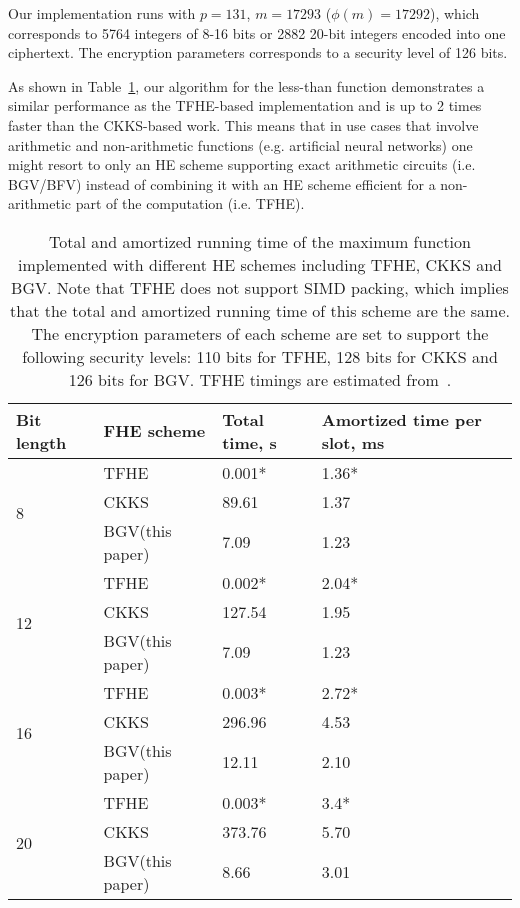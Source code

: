     Our implementation runs with $p=131$, $m=17293$ ($\phi(m)=17292$), which corresponds to 5764 integers of 8-16 bits or 2882 20-bit integers encoded into one ciphertext.
    The encryption parameters corresponds to a security level of 126 bits.
    
    As shown in Table~\ref{table:other_he_schemes}, our algorithm for the less-than function demonstrates a similar performance as the TFHE-based implementation and is up to 2 times faster than the CKKS-based work.
    This means that in use cases that involve arithmetic and non-arithmetic functions (e.g. artificial neural networks) one might resort to only an HE scheme supporting exact arithmetic circuits (i.e. BGV/BFV) instead of combining it with an HE scheme efficient for a non-arithmetic part of the computation (i.e. TFHE).

    \begin{table}[h]
      \centering
      \begin{tabular*}{.45\textwidth}{ p{1.2cm} p{2.1cm} p{1.0cm} p{2cm}}
        \toprule
        Bit length  & FHE scheme & Total time, s    & Amortized time per slot, ms \\
        \midrule
        \multirow{3}{*}{8}  & TFHE              & 0.001*     & 1.36* \\
                            & CKKS              & 89.61     & 1.37 \\
                            & BGV(this paper)   & 7.09      & 1.23 \\
        \midrule
        \multirow{3}{*}{12}  & TFHE             & 0.002*     & 2.04* \\
                             & CKKS             & 127.54    & 1.95 \\
                             & BGV(this paper)  & 7.09      & 1.23 \\
        \midrule
        \multirow{3}{*}{16}  & TFHE            & 0.003*     & 2.72* \\
                             & CKKS            & 296.96     & 4.53 \\
                             & BGV(this paper)  & 12.11      & 2.10 \\
        \midrule
        \multirow{3}{*}{20}  & TFHE            & 0.003*      & 3.4* \\
                             & CKKS            & 373.76     & 5.70 \\
                             & BGV(this paper)   & 8.66     &  3.01\\ 
        \bottomrule
      \end{tabular*}
      \caption{Total and amortized running time of the maximum function implemented with different HE schemes including TFHE, CKKS and BGV. Note that TFHE does not support SIMD packing, which implies that the total and amortized running time of this scheme are the same. The encryption parameters of each scheme are set to support the following security levels: 110 bits for TFHE, 128 bits for CKKS and 126 bits for BGV.
      \newline *TFHE timings are estimated from~\cite{AC:CGGI17}.}
      \label{table:other_he_schemes}
    \end{table}
    
